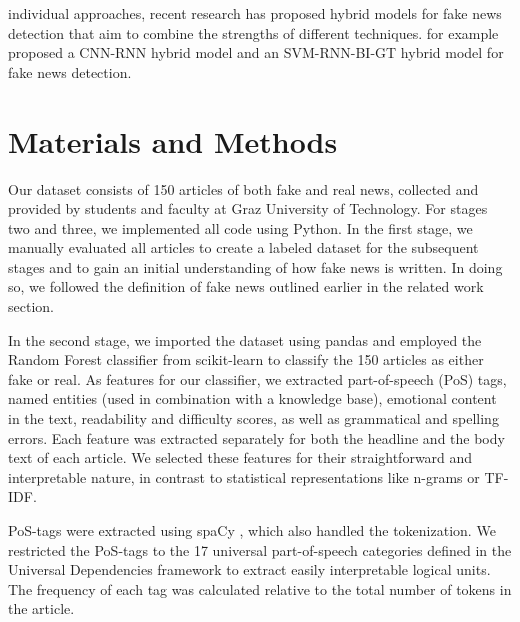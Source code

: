 \documentclass[12pt,a4paper,twocolumn]{article}
\begin{document}
individual approaches, recent research has proposed hybrid models for fake news detection that aim to combine the strengths of different techniques. \citet{Nasir2021Hybrid} for example proposed a CNN-RNN hybrid model and \citet{Albahar2021Hybrid} an SVM-RNN-BI-GT hybrid model for fake news detection.

\section{Materials and Methods}
\label{sec:methods}
Our dataset consists of 150 articles of both fake and real news, collected and provided by students and faculty at Graz University of Technology. For stages two and three, we implemented all code using Python. In the first stage, we manually evaluated all articles to create a labeled dataset for the subsequent stages and to gain an initial understanding of how fake news is written. In doing so, we followed the definition of fake news outlined earlier in the related work section.

In the second stage, we imported the dataset using pandas \citep{Pandas} and employed the Random Forest classifier from scikit-learn \citep{scikit-learn} to classify the 150 articles as either fake or real. As features for our classifier, we extracted part-of-speech (PoS) tags, named entities (used in combination with a knowledge base), emotional content in the text, readability and difficulty scores, as well as grammatical and spelling errors. Each feature was extracted separately for both the headline and the body text of each article. We selected these features for their straightforward and interpretable nature, in contrast to statistical representations like n-grams or TF-IDF.

PoS-tags were extracted using spaCy \citep{spaCy}, which also handled the tokenization. We restricted the PoS-tags to the 17 universal part-of-speech categories defined in the Universal Dependencies framework \citep{universaldependencies} to extract easily interpretable logical units. The frequency of each tag was calculated relative to the total number of tokens in the article.
\end{document}
